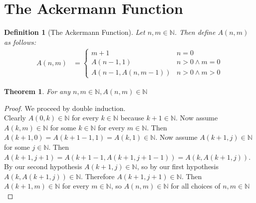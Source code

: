 \documentclass[12pt, letterpaper]{article}
\newtheorem{theorem}{Theorem}
\newtheorem*{definition}{Definition}
\theoremstyle{case}
\begin{document}
  \section{The Ackermann Function}
    \begin{definition}[The Ackermann Function]
      Let $n, m \in \mathbb{N}$. Then define $A(n, m)$ as follows:
      \begin{equation*}
        \begin{aligned}
          A(n, m) &=
          \begin{cases}
            m + 1                   & n = 0 \\
            A(n - 1, 1)             & n > 0 \wedge m = 0 \\
            A(n - 1, A(n, m - 1))   & n > 0 \wedge m > 0
          \end{cases}
        \end{aligned}
      \end{equation*}
    \end{definition}

    \begin{theorem}
      \label{inN}
      For any $n, m \in \mathbb{N}, A(n, m) \in \mathbb{N}$
    \end{theorem}
    \begin{proof}
      We proceed by double induction. \\
      Clearly $A(0, k) \in \mathbb{N}$ for every $k \in \mathbb{N}$ because $k + 1 \in \mathbb{N}$.
      Now assume $A(k, m) \in \mathbb{N}$ for some $k \in \mathbb{N}$ for every $m \in \mathbb{N}$.
      Then $A(k + 1, 0) = A(k + 1 - 1, 1) = A(k, 1) \in \mathbb{N}$.
      Now assume $A(k + 1, j) \in \mathbb{N}$ for some $j \in \mathbb{N}$.
      Then $A(k + 1, j + 1) = A(k + 1 - 1, A(k + 1, j + 1 - 1)) = A(k, A(k + 1, j))$.
      By our second hypothesis $A(k + 1, j) \in \mathbb{N}$, so by our first hypothesis $A(k, A(k + 1, j)) \in \mathbb{N}$.
      Therefore $A(k + 1, j + 1) \in \mathbb{N}$. Then $A(k + 1, m) \in \mathbb{N}$ for every $m \in \mathbb{N}$, so
      $A(n, m) \in \mathbb{N}$ for all choices of $n, m \in \mathbb{N}$
    \end{proof}
\end{document}
